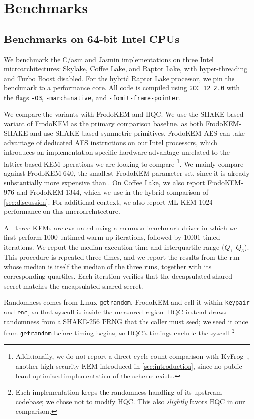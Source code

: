 \section{Benchmarks}
\label{sec:benchmarks}

\subsection{Benchmarks on 64-bit Intel CPUs}
\label{sec:intelbench}
We benchmark the C/asm and Jasmin implementations on three Intel microarchitectures: Skylake, Coffee Lake, and Raptor Lake, with hyper-threading and Turbo 
Boost disabled. For the hybrid Raptor Lake processor, we pin the benchmark to a performance core. All \kaiburr code is compiled using \texttt{GCC 12.2.0}
with the flags \texttt{-O3}, \texttt{-march=native}, and \texttt{-fomit-frame-pointer}.

We compare the \kaiburr variants with FrodoKEM and HQC. We use the SHAKE-based variant of FrodoKEM as the
primary comparison baseline, as both FrodoKEM-SHAKE and \kaiburr use SHAKE-based symmetric primitives.
FrodoKEM-AES can take advantage of dedicated AES instructions on our Intel processors, which introduces an 
implementation-specific hardware advantage unrelated to the lattice-based KEM operations we are looking to compare%
\footnote{Additionally, we do not report a direct cycle-count comparison with KyFrog~\cite{kyfrog}, another high-security KEM introduced in \cref{sec:introduction}, since no
public hand-optimized implementation of the scheme exists.}.
We mainly compare against FrodoKEM-640, the smallest FrodoKEM parameter set, since it is already substantially
more expensive than \kaiburr. On Coffee Lake, we also report FrodoKEM-976 and FrodoKEM-1344, which we use in
the hybrid comparison of \cref{sec:discussion}. For additional context, we also report ML-KEM-1024 performance on this microarchitecture.

All three KEMs are evaluated using a common benchmark driver in which we first perform $1000$ untimed warm-up iterations, 
followed by $10001$ timed iterations. We report the median 
execution time and interquartile range ($Q_1$--$Q_3$). This procedure is repeated three times, and we report the 
results from the run whose median is itself the median of the three runs, together with its corresponding quartiles. 
Each iteration verifies that the decapsulated shared secret matches the encapsulated shared secret.

Randomness comes from Linux \texttt{getrandom}. FrodoKEM and \kaiburr call it within \texttt{keypair} and \texttt{enc}, 
so that syscall is inside the measured region. HQC instead draws randomness from a SHAKE-256 PRNG that the
caller must seed; we seed it once from \texttt{getrandom} before timing begins, so HQC's timings exclude the syscall%
\footnote{Each implementation keeps the
randomness handling of its upstream codebase; we chose not to modify HQC.
This also \emph{slightly} favors HQC in our comparison.}.

